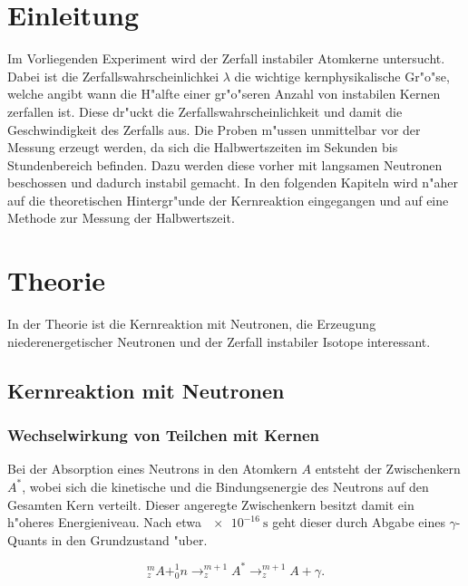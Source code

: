 \section{Einleitung}
	\label{sec:einleitung}

	Im Vorliegenden Experiment wird der Zerfall instabiler Atomkerne untersucht.
	Dabei ist die Zerfallswahrscheinlichkei $\lambda$ die wichtige kernphysikalische Gr"o"se, welche angibt wann die H"alfte einer gr"o"seren Anzahl von instabilen Kernen zerfallen ist.
	Diese dr"uckt die Zerfallswahrscheinlichkeit und damit die Geschwindigkeit des Zerfalls aus.
	Die Proben m"ussen unmittelbar vor der Messung erzeugt werden, da sich die Halbwertszeiten im Sekunden bis Stundenbereich befinden.
	Dazu werden diese vorher mit langsamen Neu\-tro\-nen beschossen und dadurch instabil gemacht.
	In den folgenden Kapiteln wird n"aher auf die theoretischen Hintergr"unde der Kernreaktion eingegangen und auf eine Methode zur Messung der Halbwertszeit.

\section{Theorie}
\label{sec:theorie}

	In der Theorie ist die Kernreaktion mit Neutronen, die Erzeugung niederenergetischer Neutronen und der Zerfall instabiler Isotope interessant.

	\subsection{Kernreaktion mit Neutronen}
	\label{sub:kernreaktion_mit_neutronen}

		\subsubsection{Wechselwirkung von Teilchen mit Kernen}
		\label{sub:wechselwirkung_von_teilchen_mit_kernen}
			
			Bei der Absorption eines Neutrons in den Atomkern $A$ entsteht der Zwischenkern $A^*$, wobei sich die kinetische und die Bindungsenergie des Neutrons auf den Gesamten Kern verteilt.
			Dieser angeregte Zwischenkern besitzt damit ein h"oheres Energieniveau.
			Nach etwa $\SI{e-16}{\second}$ geht dieser durch Abgabe eines $\gamma$-Quants in den Grundzustand "uber.

			\begin{equation*}
				^m_zA + ^1_0n \rightarrow ^{m+1}_zA^* \rightarrow ^{m+1}_zA + \gamma.
			\end{equation*}

